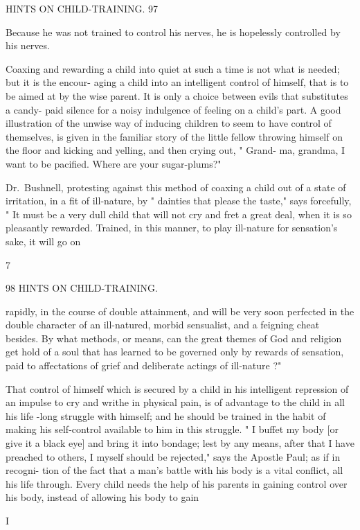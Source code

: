 \documentclass[
]{book}
\begin{document}
HINTS ON CHILD-TRAINING. 97

Because he was not trained to control his nerves, he is hopelessly controlled by his nerves.

Coaxing and rewarding a child into quiet at such a time is not what is needed; but it is the encour- aging a child into an intelligent control of himself, that is to be aimed at by the wise parent. It is only a choice between evils that substitutes a candy- paid silence for a noisy indulgence of feeling on a child's part. A good illustration of the unwise way of inducing children to seem to have control of themselves, is given in the familiar story of the little fellow throwing himself on the floor and kicking and yelling, and then crying out, " Grand- ma, grandma, I want to be pacified. Where are your sugar-plums?"

Dr.~Bushnell, protesting against this method of coaxing a child out of a state of irritation, in a fit of ill-nature, by " dainties that please the taste," says forcefully, " It must be a very dull child that will not cry and fret a great deal, when it is so pleasantly rewarded. Trained, in this manner, to play ill-nature for sensation's sake, it will go on

7

98 HINTS ON CHILD-TRAINING.

rapidly, in the course of double attainment, and will be very soon perfected in the double character of an ill-natured, morbid sensualist, and a feigning cheat besides. By what methods, or means, can the great themes of God and religion get hold of a soul that has learned to be governed only by rewards of sensation, paid to affectations of grief and deliberate actings of ill-nature ?"

That control of himself which is secured by a child in his intelligent repression of an impulse to cry and writhe in physical pain, is of advantage to the child in all his life -long struggle with himself; and he should be trained in the habit of making his self-control available to him in this struggle. " I buffet my body {[}or give it a black eye{]} and bring it into bondage; lest by any means, after that I have preached to others, I myself should be rejected," says the Apostle Paul; as if in recogni- tion of the fact that a man's battle with his body is a vital conflict, all his life through. Every child needs the help of his parents in gaining control over his body, instead of allowing his body to gain

I
\end{document}
